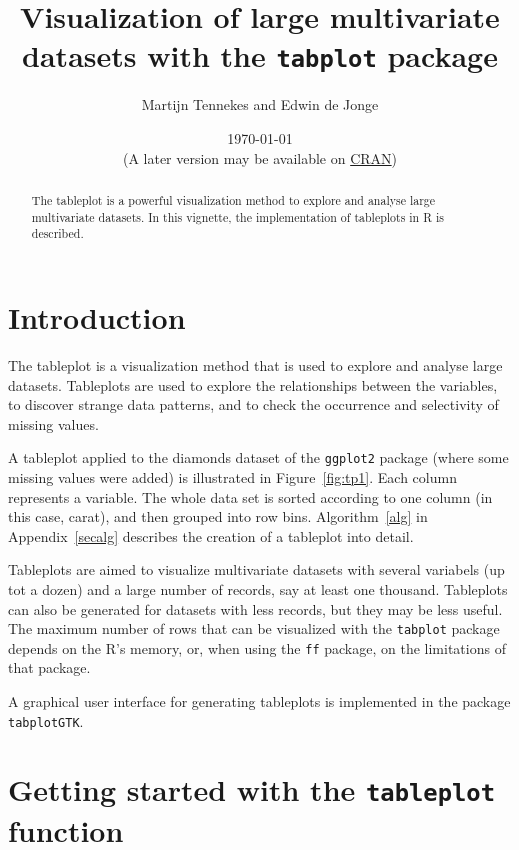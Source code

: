 \documentclass[11pt, fleqn, a4paper]{article}\usepackage{graphicx, color}
\title{Visualization of large multivariate datasets with the {\tt tabplot} package}
\author{Martijn Tennekes and Edwin de Jonge}
\date{\today\\ (A later version may be available on \href{http://cran.r-project.org/package=tabplot}{CRAN})}
\begin{document}

\maketitle
\begin{abstract}

The tableplot is a powerful visualization method to explore and analyse large multivariate datasets. In this vignette, the implementation of tableplots in R is described. 


\end{abstract}



\maketitle


\section{Introduction}
The tableplot is a visualization method that is used to explore and analyse large datasets. Tableplots are used to explore the relationships between the variables, to discover strange data patterns, and to check the occurrence and selectivity of missing values. 

A tableplot applied to the diamonds dataset of the {\tt ggplot2} package (where some missing values were added) is illustrated in Figure~\ref{fig:tp1}. Each column represents a variable. The whole data set is sorted according to one column (in this case, carat), and then grouped into row bins. Algorithm~\ref{alg} in Appendix~\ref{secalg} describes the creation of a tableplot into detail.

Tableplots are aimed to visualize multivariate datasets with several variabels (up tot a dozen) and a large number of records, say at least one thousand. Tableplots can also be generated for datasets with less records, but they may be less useful. The maximum number of rows that can be visualized with the {\tt tabplot} package depends on the R's memory, or, when using the {\tt ff} package, on the limitations of that package.

A graphical user interface for generating tableplots is implemented in the package {\tt tabplotGTK}.

\section{Getting started with the {\tt tableplot} function}
\end{document}
